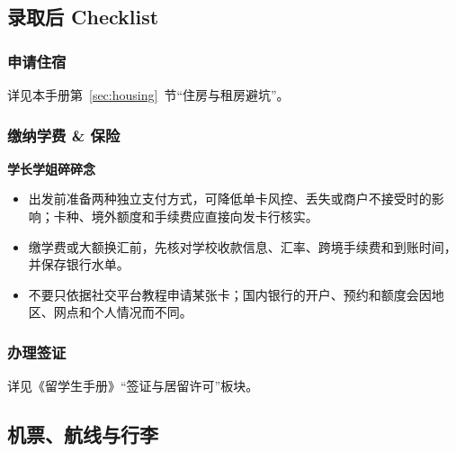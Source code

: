 \subsection{录取后 Checklist}

\subsubsection{申请住宿}
详见本手册第~\ref{sec:housing}~节“住房与租房避坑”。

\subsubsection{缴纳学费 \& 保险}

\begin{grayleftbox}\textbf{学长学姐碎碎念}
\experiencenotice
\begin{itemize}
  \item 出发前准备两种独立支付方式，可降低单卡风控、丢失或商户不接受时的影响；卡种、境外额度和手续费应直接向发卡行核实。
  \item 缴学费或大额换汇前，先核对学校收款信息、汇率、跨境手续费和到账时间，并保存银行水单。
  \item 不要只依据社交平台教程申请某张卡；国内银行的开户、预约和额度会因地区、网点和个人情况而不同。
\end{itemize}
\end{grayleftbox}

\subsubsection{办理签证}
详见《留学生手册》“签证与居留许可”板块。


\subsection{机票、航线与行李}

